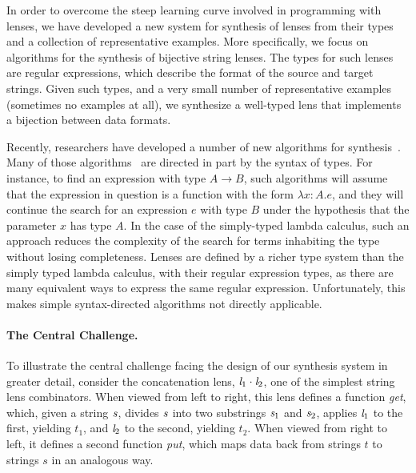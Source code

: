 \documentclass[numbers]{sigplanconf}
\begin{document}
In order to overcome the steep learning curve involved in programming
with lenses, we have developed a new system for synthesis of lenses
from their types and a collection of representative examples.  More
specifically, we focus on algorithms for the synthesis of bijective
string lenses.  The types for such lenses are regular expressions,
which describe the format of the source and target strings.  Given
such types, and a very small number of representative examples (sometimes
no examples at all), we synthesize a well-typed lens that implements
a bijection between data formats.

Recently, researchers have developed a number of new algorithms for
synthesis~\cite{yag+:pldi16,?,?}.  Many of those
algorithms~\cite{osera+:pldi15,frankle+:popl16,armando+:pldi16} are
directed in part by the syntax of types.  For instance, to find an
expression with type $A \rightarrow B$, such algorithms will assume
that the expression in question is a function with the form $\lambda
x{:}A. e$, and they will continue the search for an expression $e$
with type $B$ under the hypothesis that the parameter $x$ has type
$A$.  In the case of the simply-typed lambda calculus, such an
approach reduces the complexity of the search for terms inhabiting the
type without losing completeness.  Lenses are defined by a richer type system
than the simply typed lambda calculus,
with their regular expression types, as
there are many equivalent ways to express the same regular expression.
Unfortunately, this makes simple
syntax-directed algorithms not directly applicable.

\paragraph*{The Central Challenge.}
To illustrate the central challenge facing the design of our synthesis system
in greater detail,
consider the concatenation lens, $\mathit{l}_1 \cdot \mathit{l}_2$,
one of the simplest string lens combinators.  
When viewed from left to right, this lens defines a function \emph{get}, which,
given a string 
$\mathit{s}$, divides $\mathit{s}$ into two substrings $\mathit{s}_1$ 
and $\mathit{s}_2$, applies $\mathit{l}_1$ to the first, yielding $t_1$,
and $\mathit{l}_2$ to the second, yielding $t_2$.  When viewed from
right to left, it defines a second function \emph{put}, which maps
data back from strings $t$ to strings $s$ in an analogous way.
\end{document}
